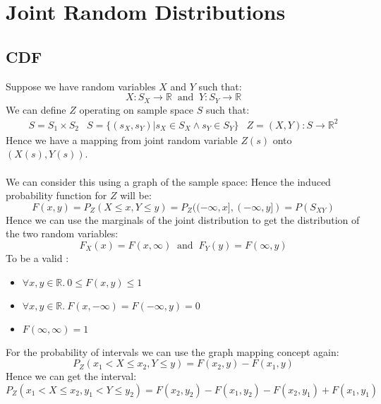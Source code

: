 \chapter{Joint Random Distributions}

\section{CDF}
Suppose we have random variables $X$ and $Y$ such that:
\[X: S_X \to \mathbb{R} \ \text{ and } \ Y: S_Y \to \mathbb{R}\]
We can define $Z$ operating on sample space $S$ such that:
\[\begin{matrix}
		S = S_1 \times S_2 & S = \{(s_X, s_Y) | s_X \in S_X \land s_Y \in S_Y\} & Z = (X, Y): S \to \mathbb{R}^2
	\end{matrix}\]
Hence we have a mapping from joint random variable $Z(s)$ onto $(X(s), Y(s))$.
\\
\\ We can consider this using a graph of the sample space:
Hence the induced probability function for $Z$ will be:
\[F(x,y) = P_Z(X \leq x, Y \leq y) = P_Z((-\infty, x], (- \infty, y]) = P(S_{XY})\]
Hence we can use the marginals of the joint distribution to get the distribution of the two random variables:
\[F_X(x) = F(x, \infty) \ \text{ and } \ F_Y(y) = F(\infty, y)\]
To be a valid :
\begin{itemize}
\item $\forall x,y \in \mathbb{R}. \ 0 \leq F(x,y) \leq 1$
\item $\forall x,y \in \mathbb{R}. \ F(x, -\infty) = F(-\infty, y) = 0$
\item $F(\infty, \infty) = 1$
\end{itemize}

For the probability of intervals we can use the graph mapping concept again:
\[P_Z(x_1 < X \leq x_2, Y \leq y) = F(x_2, y) - F(x_1, y)\]
Hence we can get the interval:
\[P_Z(x_1 < X \leq x_2, y_1 < Y \leq y_2) = F(x_2, y_2) - F(x_1, y_2) -F(x_2,y_1) + F(x_1,y_1)\]

